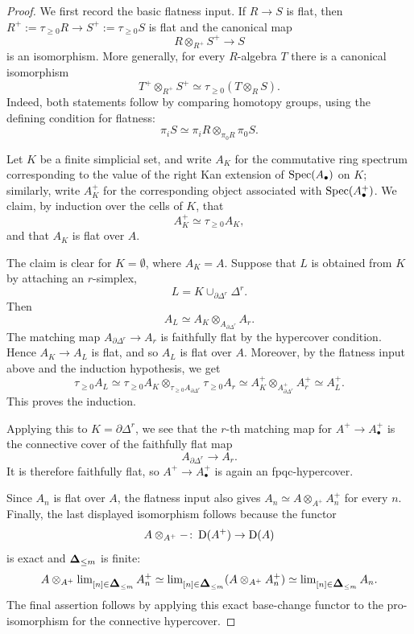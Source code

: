 \documentclass[11pt]{book}
\begin{document}
	\begin{proof}
		We first record the basic flatness input. If $R \to S$ is flat, then $R^+ := \tau_{\geq 0}R \to S^+ := \tau_{\geq 0}S$ is flat and the canonical map
		\[
			R \otimes_{R^+} S^+ \to S
		\]
		is an isomorphism. More generally, for every $R$-algebra $T$ there is a canonical isomorphism
		\[
			T^+ \otimes_{R^+} S^+ \simeq \tau_{\geq 0}(T \otimes_R S).
		\]
		Indeed, both statements follow by comparing homotopy groups, using the defining condition for flatness:
		\[
			\pi_i S \simeq \pi_i R \otimes_{\pi_0 R} \pi_0 S.
		\]

		Let $K$ be a finite simplicial set, and write $A_K$ for the commutative ring spectrum corresponding to the value of the right Kan extension of $\operatorname{Spec}(A_{\bullet})$ on $K$; similarly, write $A^+_K$ for the corresponding object associated with $\operatorname{Spec}(A^+_{\bullet})$. We claim, by induction over the cells of $K$, that
		\[
			A^+_K \simeq \tau_{\geq 0} A_K,
		\]
		and that $A_K$ is flat over $A$.

		The claim is clear for $K = \emptyset$, where $A_K = A$. Suppose that $L$ is obtained from $K$ by attaching an $r$-simplex,
		\[
			L = K \cup_{\partial \Delta^r} \Delta^r.
		\]
		Then
		\[
			A_L \simeq A_K \otimes_{A_{\partial \Delta^r}} A_r.
		\]
		The matching map $A_{\partial \Delta^r} \to A_r$ is faithfully flat by the hypercover condition. Hence $A_K \to A_L$ is flat, and so $A_L$ is flat over $A$. Moreover, by the flatness input above and the induction hypothesis, we get
		\[
			\tau_{\geq 0}A_L
			\simeq
			\tau_{\geq 0}A_K \otimes_{\tau_{\geq 0}A_{\partial \Delta^r}} \tau_{\geq 0}A_r
			\simeq
			A^+_K \otimes_{A^+_{\partial \Delta^r}} A^+_r
			\simeq
			A^+_L.
		\]
		This proves the induction.

		Applying this to $K = \partial \Delta^r$, we see that the $r$-th matching map for $A^+ \to A^+_{\bullet}$ is the connective cover of the faithfully flat map
		\[
			A_{\partial \Delta^r} \to A_r.
		\]
		It is therefore faithfully flat, so $A^+ \to A^+_{\bullet}$ is again an fpqc-hypercover.

		Since $A_n$ is flat over $A$, the flatness input also gives $A_n \simeq A \otimes_{A^+} A_n^+$ for every $n$. Finally, the last displayed isomorphism follows because the functor
		\[
			A \otimes_{A^+} -\colon \operatorname{\mathrm{D}}(A^+) \to \operatorname{\mathrm{D}}(A)
		\]
		is exact and $\simp_{\leq m}$ is finite:
		\[
			A \otimes_{A^+} \lim_{[n] \in \simp_{\leq m}} A_n^+
			\simeq
			\lim_{[n] \in \simp_{\leq m}} (A \otimes_{A^+} A_n^+)
			\simeq
			\lim_{[n] \in \simp_{\leq m}} A_n.
		\]
		The final assertion follows by applying this exact base-change functor to the pro-isomorphism for the connective hypercover.
	\end{proof}
\end{document}
